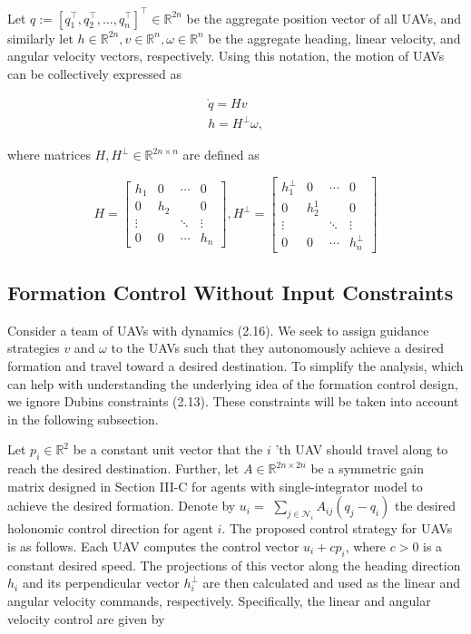 \documentclass[10pt]{article}
\begin{document}
Let $q:=\left[q_{1}^{\top}, q_{2}^{\top}, \ldots, q_{n}^{\top}\right]^{\top} \in \mathbb{R}^{2 n}$ be the aggregate position vector of all UAVs, and similarly let $h \in \mathbb{R}^{2 n}, v \in \mathbb{R}^{n}, \omega \in \mathbb{R}^{n}$ be the aggregate heading, linear velocity, and angular velocity vectors, respectively. Using this notation, the motion of UAVs can be collectively expressed as

$$
\begin{gathered}
\grave{q}=H v \\
h=H^{\perp} \omega,
\end{gathered}
$$

where matrices $H, H^{\perp} \in \mathbb{R}^{2 n \times n}$ are defined as

$$
H=\left[\begin{array}{cccc}
h_{1} & 0 & \cdots & 0 \\
0 & h_{2} & & 0 \\
\vdots & & \ddots & \vdots \\
0 & 0 & \cdots & h_{n}
\end{array}\right], H^{\perp}=\left[\begin{array}{cccc}
h_{1}^{\perp} & 0 & \cdots & 0 \\
0 & h_{2}^{1} & & 0 \\
\vdots & & \ddots & \vdots \\
0 & 0 & \cdots & h_{n}^{\perp}
\end{array}\right]
$$

\subsection{Formation Control Without Input Constraints}
Consider a team of UAVs with dynamics (2.16). We seek to assign guidance strategies $v$ and $\omega$ to the UAVs such that they autonomously achieve a desired formation and travel toward a desired destination. To simplify the analysis, which can help with understanding the underlying idea of the formation control design, we ignore Dubins constraints (2.13). These constraints will be taken into account in the following subsection.

Let $p_{i} \in \mathbb{R}^{2}$ be a constant unit vector that the $i$ 'th UAV should travel along to reach the desired destination. Further, let $A \in \mathbb{R}^{2 n \times 2 n}$ be a symmetric gain matrix designed in Section III-C for agents with single-integrator model to achieve the desired formation. Denote by $u_{i}=$ $\sum_{j \in \mathcal{N}_{i}} A_{i j}\left(q_{j}-q_{i}\right)$ the desired holonomic control direction for agent $i$. The proposed control strategy for UAVs is as follows. Each UAV computes the control vector $u_{i}+c p_{i}$, where $c>0$ is a constant desired speed. The projections of this vector along the heading direction $h_{i}$ and its perpendicular vector $h_{i}^{\perp}$ are then calculated and used as the linear and angular velocity commands, respectively. Specifically, the linear and angular velocity control are given by
\end{document}
